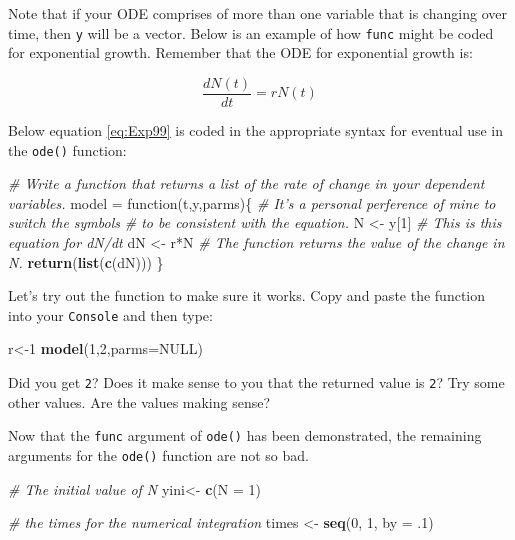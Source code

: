 \documentclass[]{book}
\newenvironment{Shaded}{\begin{snugshade}}{\end{snugshade}}
\newcommand{\KeywordTok}[1]{\textcolor[rgb]{0.13,0.29,0.53}{\textbf{{#1}}}}
\newcommand{\DataTypeTok}[1]{\textcolor[rgb]{0.13,0.29,0.53}{{#1}}}
\newcommand{\DecValTok}[1]{\textcolor[rgb]{0.00,0.00,0.81}{{#1}}}
\newcommand{\StringTok}[1]{\textcolor[rgb]{0.31,0.60,0.02}{{#1}}}
\newcommand{\CommentTok}[1]{\textcolor[rgb]{0.56,0.35,0.01}{\textit{{#1}}}}
\newcommand{\OtherTok}[1]{\textcolor[rgb]{0.56,0.35,0.01}{{#1}}}
\newcommand{\NormalTok}[1]{{#1}}
\begin{document}
Note that if your ODE comprises of more than one variable that is
changing over time, then \texttt{y} will be a vector. Below is an
example of how \texttt{func} might be coded for exponential growth.
Remember that the ODE for exponential growth is:

\begin{equation}
\frac{dN(t)}{dt} = rN(t) 
\label{eq:Exp99}
\end{equation}

Below equation \eqref{eq:Exp99} is coded in the appropriate syntax for
eventual use in the \texttt{ode()} function:

\begin{Shaded}
\begin{Highlighting}[]
\CommentTok{# Write a function that returns a list of the rate of change in your dependent variables.}
\NormalTok{model =}\StringTok{ }\NormalTok{function(t,y,parms)\{}
  \CommentTok{# It's a personal perference of mine to switch the symbols}
  \CommentTok{# to be consistent with the equation.}
  \NormalTok{N <-}\StringTok{ }\NormalTok{y[}\DecValTok{1}\NormalTok{]}
  \CommentTok{# This is this equation for dN/dt}
  \NormalTok{dN <-}\StringTok{ }\NormalTok{r*N}
  \CommentTok{# The function returns the value of the change in N.}
\KeywordTok{return}\NormalTok{(}\KeywordTok{list}\NormalTok{(}\KeywordTok{c}\NormalTok{(dN)))}
\NormalTok{\}}
\end{Highlighting}
\end{Shaded}

Let's try out the function to make sure it works. Copy and paste the
function into your \texttt{Console} and then type:

\begin{Shaded}
\begin{Highlighting}[]
\NormalTok{r<-}\DecValTok{1}
\KeywordTok{model}\NormalTok{(}\DecValTok{1}\NormalTok{,}\DecValTok{2}\NormalTok{,}\DataTypeTok{parms=}\OtherTok{NULL}\NormalTok{)}
\end{Highlighting}
\end{Shaded}

Did you get \texttt{2}? Does it make sense to you that the returned
value is \texttt{2}? Try some other values. Are the values making sense?

Now that the \texttt{func} argument of \texttt{ode()} has been
demonstrated, the remaining arguments for the \texttt{ode()} function
are not so bad.

\begin{Shaded}
\begin{Highlighting}[]
\CommentTok{# The initial value of N}
\NormalTok{yini<-}\StringTok{ }\KeywordTok{c}\NormalTok{(}\DataTypeTok{N =} \DecValTok{1}\NormalTok{)}

\CommentTok{# the times for the numerical integration}
\NormalTok{times <-}\StringTok{ }\KeywordTok{seq}\NormalTok{(}\DecValTok{0}\NormalTok{, }\DecValTok{1}\NormalTok{, }\DataTypeTok{by =} \NormalTok{.}\DecValTok{1}\NormalTok{)}
\end{Highlighting}
\end{Shaded}
\end{document}
